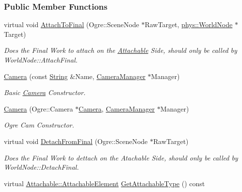 \subsubsection*{Public Member Functions}
\begin{DoxyCompactItemize}
\item 
virtual void \hyperlink{classphys_1_1Camera_afaa81ebb01f1c64a324f802b6743b6f7}{AttachToFinal} (Ogre::SceneNode $\ast$RawTarget, \hyperlink{classphys_1_1WorldNode}{phys::WorldNode} $\ast$Target)
\begin{DoxyCompactList}\small\item\em Does the Final Work to attach on the \hyperlink{classphys_1_1Attachable}{Attachable} Side, should only be called by WorldNode::AttachFinal. \item\end{DoxyCompactList}\item 
\hyperlink{classphys_1_1Camera_a863e7b7a0fb4db7969014d8391b5ca30}{Camera} (const \hyperlink{namespacephys_aa03900411993de7fbfec4789bc1d392e}{String} \&Name, \hyperlink{classphys_1_1CameraManager}{CameraManager} $\ast$Manager)
\begin{DoxyCompactList}\small\item\em Basic \hyperlink{classphys_1_1Camera}{Camera} Constructor. \item\end{DoxyCompactList}\item 
\hyperlink{classphys_1_1Camera_a0510d4f9bf6fb195115272cbd116e8dd}{Camera} (Ogre::Camera $\ast$\hyperlink{classphys_1_1Camera}{Camera}, \hyperlink{classphys_1_1CameraManager}{CameraManager} $\ast$Manager)
\begin{DoxyCompactList}\small\item\em Ogre Cam Constructor. \item\end{DoxyCompactList}\item 
virtual void \hyperlink{classphys_1_1Camera_a087e4e09b4b0c7adf4c267c5e8e1a6d9}{DetachFromFinal} (Ogre::SceneNode $\ast$RawTarget)
\begin{DoxyCompactList}\small\item\em Does the Final Work to dettach on the Atachable Side, should only be called by WorldNode::DetachFinal. \item\end{DoxyCompactList}\item 
virtual \hyperlink{classphys_1_1Attachable_acd1fca033e7cc0bb3024a92d466d213a}{Attachable::AttachableElement} \hyperlink{classphys_1_1Camera_a4dce38bad69f1bc58f510ce01d6d6edf}{GetAttachableType} () const 

\end{DoxyCompactItemize}
